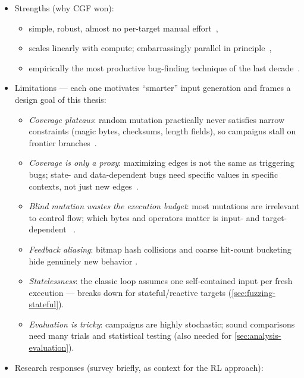 \begin{itemize}
  \item Strengths (why CGF won):
    \begin{itemize}
      \item simple, robust, almost no per-target manual effort~\cite{manes_art_2019},
      \item scales linearly with compute; embarrassingly parallel in
        principle~\cite{zhou_kraken_2025},
      \item empirically the most productive bug-finding technique of the last
        decade~\cite{manes_art_2019,fioraldi_afl_nodate}.
    \end{itemize}
  \item Limitations --- each one motivates ``smarter'' input generation and frames a design goal of
    this thesis:
    \begin{itemize}
      \item \emph{Coverage plateaus}: random mutation practically never satisfies narrow
        constraints (magic bytes, checksums, length fields), so campaigns stall on frontier
        branches~\cite{stephens_driller_2016,she_neuzz_2019}.
      \item \emph{Coverage is only a proxy}: maximizing edges is not the same as triggering bugs;
        state- and data-dependent bugs need specific values in specific contexts, not just new
        edges~\cite{chen_critical_nodate}.
      \item \emph{Blind mutation wastes the execution budget}: most mutations are irrelevant to
        control flow; which bytes and operators matter is input- and target-dependent
        ~\cite{lyu_mopt_nodate,binosi_rainfuzz_2023}.
      \item \emph{Feedback aliasing}: bitmap hash collisions and coarse hit-count bucketing hide
        genuinely new behavior .
      \item \emph{Statelessness}: the classic loop assumes one self-contained input per fresh
        execution --- breaks down for stateful/reactive targets (\cref{sec:fuzzing-stateful}).
      \item \emph{Evaluation is tricky}: campaigns are highly stochastic; sound comparisons need
        many trials and statistical testing  (also needed for \cref{sec:analysis-evaluation}).
    \end{itemize}
  \item Research responses (survey briefly, as context for the RL approach):

\end{itemize}
